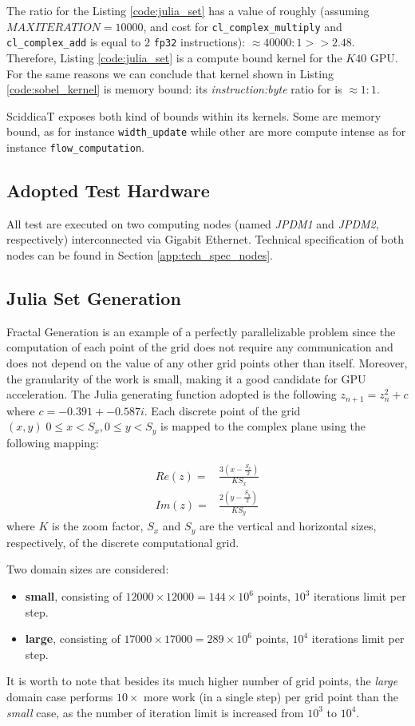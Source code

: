 The ratio for the Listing \ref{code:julia_set} has a value of roughly (assuming $MAXITERATION=10000$, and cost for \texttt{cl\_complex\_multiply} and \texttt{cl\_complex\_add} is equal to $2$ \texttt{fp32} instructions): $\approx 40000:1 >> 2.48$. Therefore, Listing \ref{code:julia_set} is a compute bound kernel for the $K40$ GPU.
For the same reasons we can conclude that kernel shown in Listing  \ref{code:sobel_kernel} is memory bound: its \textit{instruction:byte} ratio for is $\approx 1:1$.

SciddicaT exposes both kind of  bounds  within its kernels. Some are memory bound, as for instance \texttt{width\_update} while other are more compute intense as for instance \texttt{flow\_computation}. 

\subsection{Adopted Test Hardware}
All test are executed on two computing nodes (named \textit{JPDM1} and \textit{JPDM2}, respectively) interconnected via Gigabit Ethernet.
Technical specification of both nodes can be found in Section \ref{app:tech_spec_nodes}.


\subsection{Julia Set Generation} \label{subsec:julia_performance}
Fractal Generation is an example of a perfectly parallelizable problem since the computation of each point of the grid does not require any communication and does not depend on the value of any other grid points other than itself. Moreover, the granularity of the work is small, making it a good candidate for GPU acceleration.
The Julia generating function adopted is the following $z_{n+1} = z^2_n + c$ where $c=-0.391+-0.587i$. Each discrete point of the grid $(x,y)\; 0\leq x < S_x, 0\leq y < S_y$ is mapped to the complex plane using the following mapping:

\begin{align*}
    Re(z)=&\frac{3(x-\frac{S_x}{2})}{K S_x} \\
    Im(z)=&\frac{2(y-\frac{S_y}{2})}{K S_y}
\end{align*}
where $K$ is the zoom factor, $S_x$ and $S_y$ are the vertical and horizontal sizes, respectively, of the discrete computational grid.

Two domain sizes are considered:
    \begin{itemize}
        \item \textbf{small}, consisting of  $12000 \times 12000 = 144 \times 10^6$ points, $10^3$ iterations limit per step.
        \item \textbf{large}, consisting of $17000 \times 17000 = 289 \times 10^6$ points, $10^4$ iterations limit per step.
    \end{itemize}
It is worth to note that besides its much higher number of grid points, the \textit{large} domain case performs $10 \times$ more work (in a single step) per grid point than the \textit{small} case, as the number of iteration limit is increased from $10^3$ to $10^4$.

